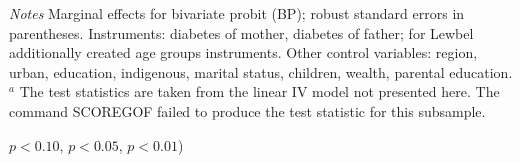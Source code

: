 \begin{table}[ph]
\begin{center}
\begin{adjustbox}{max width=\textwidth, center}
\begin{threeparttable}
{\begin{tabular}{l*{4}{S S}}
\end{tabular}
\begin{tablenotes}
\item \textit{Notes}  Marginal effects for bivariate probit (BP); robust standard errors in parentheses. Instruments: diabetes of mother, diabetes of father; for Lewbel additionally created age groups instruments. Other control variables: region, urban, education, indigenous, marital status, children, wealth, parental education. $^a$ The test statistics are taken from the linear IV model not presented here. The command SCOREGOF failed to produce the test statistic for this subsample.
\item \sym{*} \(p<0.10\), \sym{**} \(p<0.05\), \sym{***} \(p<0.01\))
\end{tablenotes}
}
\end{threeparttable}
 \end{adjustbox}
\end{center}
\end{table}


\clearpage

